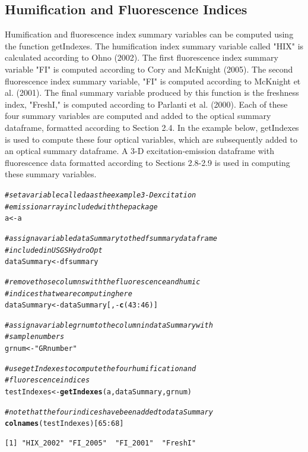 \documentclass[a4paper,11pt]{article}\usepackage[]{graphicx}\usepackage[]{color}
\makeatletter
\newcommand{\hlnum}[1]{\textcolor[rgb]{0.686,0.059,0.569}{#1}}%
\newcommand{\hlstr}[1]{\textcolor[rgb]{0.192,0.494,0.8}{#1}}%
\newcommand{\hlcom}[1]{\textcolor[rgb]{0.678,0.584,0.686}{\textit{#1}}}%
\newcommand{\hlopt}[1]{\textcolor[rgb]{0,0,0}{#1}}%
\newcommand{\hlstd}[1]{\textcolor[rgb]{0.345,0.345,0.345}{#1}}%
\newcommand{\hlkwb}[1]{\textcolor[rgb]{0.69,0.353,0.396}{#1}}%
\newcommand{\hlkwd}[1]{\textcolor[rgb]{0.737,0.353,0.396}{\textbf{#1}}}%
\newenvironment{kframe}{%
 \def\at@end@of@kframe{}%
 \ifinner\ifhmode%
  \def\at@end@of@kframe{\end{minipage}}%
  \begin{minipage}{\columnwidth}%
 \fi\fi%
 \def\FrameCommand##1{\hskip\@totalleftmargin \hskip-\fboxsep
 \colorbox{shadecolor}{##1}\hskip-\fboxsep
     \hskip-\linewidth \hskip-\@totalleftmargin \hskip\columnwidth}%
 \MakeFramed {\advance\hsize-\width
   \@totalleftmargin\z@ \linewidth\hsize
   \@setminipage}}%
 {\par\unskip\endMakeFramed%
 \at@end@of@kframe}
\newenvironment{knitrout}{}{} %
\makeatother
\begin{document}
\subsection{Humification and Fluorescence Indices}
Humification and fluorescence index summary variables can be computed using the function getIndexes. The humification index summary variable called "HIX" is calculated according to Ohno (2002). The first fluorescence index summary variable "FI" is computed according to Cory and McKnight (2005). The second fluorescence index summary variable, "FI" is computed according to McKnight et al. (2001). The final summary variable produced by this function is the freshness index, "FreshI," is computed according to Parlanti et al. (2000). Each of these four summary variables are computed and added to the optical summary dataframe, formatted according to Section 2.4. In the example below, getIndexes is used to compute these four optical variables, which are subsequently added to an optical summary dataframe. A 3-D excitation-emission dataframe with fluorescence data formatted according to Sections 2.8-2.9 is used in computing these summary variables.

\begin{knitrout}
\color{fgcolor}\begin{kframe}
\begin{alltt}
\hlcom{# set a variable called a as the example 3-D excitation}
\hlcom{# emission array included with the package}
\hlstd{a} \hlkwb{<-} \hlstd{a}

\hlcom{# assign a variable dataSummary to the dfsummary dataframe}
\hlcom{# included in USGSHydroOpt}
\hlstd{dataSummary} \hlkwb{<-} \hlstd{dfsummary}

\hlcom{# remove those columns with the fluorescence and humic}
\hlcom{# indices that we are computing here}
\hlstd{dataSummary} \hlkwb{<-} \hlstd{dataSummary[,} \hlopt{-}\hlkwd{c}\hlstd{(}\hlnum{43}\hlopt{:}\hlnum{46}\hlstd{)]}

\hlcom{# assign a variable grnum to the column in dataSummary with}
\hlcom{# sample numbers}
\hlstd{grnum} \hlkwb{<-} \hlstr{"GRnumber"}

\hlcom{# use getIndexes to compute the four humification and}
\hlcom{# fluorescence indices}
\hlstd{testIndexes} \hlkwb{<-} \hlkwd{getIndexes}\hlstd{(a, dataSummary, grnum)}

\hlcom{# note that the four indices have been added to dataSummary}
\hlkwd{colnames}\hlstd{(testIndexes)[}\hlnum{65}\hlopt{:}\hlnum{68}\hlstd{]}
\end{alltt}
\begin{verbatim}
[1] "HIX_2002" "FI_2005"  "FI_2001"  "FreshI"  
\end{verbatim}
\end{kframe}
\end{knitrout}
\end{document}
